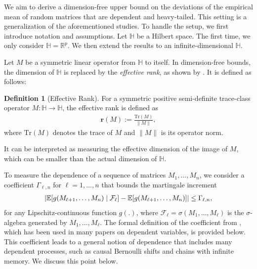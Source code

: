 \documentclass[11pt,a4paper]{article}
\theoremstyle{remark}
\theoremstyle{definition}
\newtheorem{definition}{Definition}
\theoremstyle{definition}
\newcommand{\mF}{\mathcal{F}}
\DeclarePairedDelimiter{\abs}{\lvert}{\rvert}
\newcommand{\rc}{\color{black}}
\begin{document}
\begin{bibunit}[apalike]
We aim to derive a dimension-free upper bound on the deviations of the empirical mean of random matrices that are dependent and heavy-tailed. 
This setting is a generalization of the aforementioned studies. 
To handle the setup, we first introduce {\rc notation} and assumptions.
Let $\mathbb{H}$ be a Hilbert space. The first time, we only consider $\mathbb{H} = \mathbb{R}^p$. We then extend the results to an infinite-dimensional $\mathbb{H}$.

Let $M$ be a symmetric linear operator from $\mathbb{H}$ to itself.  
In dimension-free bounds, the dimension of $\mathbb{H}$ is replaced by the \textit{effective rank}, as shown by \citep{koltchinskii2017concentration}. It is defined as follows:
\begin{definition}[Effective Rank]
For a symmetric positive semi-definite {\rc trace-class} operator $M: \mathbb{H} \to \mathbb{H}$, the effective rank is defined as
\begin{align*}
    \mathbf{r}\left(M\right) := \frac{\mathrm{Tr}(M)}{\|M\|},
\end{align*}
where $\mathrm{Tr}(M)$ denotes the trace of $M$ and $\|M\|$ is its operator norm.
\end{definition}
\noindent
It can be interpreted as measuring the effective dimension of the image of $M$, which can be smaller than the actual dimension of $ \mathbb{H}$.

To measure the dependence of a sequence of matrices $M_1,\ldots, M_n$, we consider a coefficient $\Gamma_{\ell,n}$ for $\ell = 1,\ldots, n$ that bounds the martingale increment
\begin{align*}
\abs{ \mathbb{E} [ g(M_{\ell +1},\ldots ,M_n) \mid \mathcal{F}_\ell] - \mathbb{E} [ g(M_{\ell +1}, \ldots ,M_n)] } \leq \Gamma_{\ell,n},
\end{align*}
for any Lipschitz-continuous function $g(.)$, where $\mF_\ell = \sigma(M_1,\ldots,M_\ell)$ is the $\sigma$-algebra generated by  $M_1,\ldots,M_\ell$. 
The formal definition of the coefficient from \citep{rio2000inegalites, dedecker2007weak}, which has been used in many papers on dependent variables, is provided below. This coefficient leads to a general notion of dependence that includes many dependent processes, such as causal Bernoulli shifts and chains with infinite memory.
We discuss this point below.



\end{bibunit}
\end{document}
